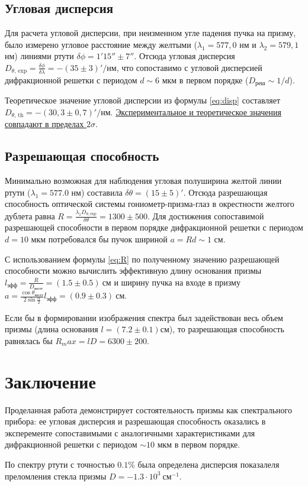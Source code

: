 \documentclass[a4paper,12pt]{article} %
\begin{document}
\subsection{Угловая дисперсия}

Для расчета угловой дисперсии, при неизменном угле падения пучка на призму, было измерено угловое расстояние между желтыми ($\lambda_1 = 577,0$ нм и $\lambda_2 = 579,1$ нм) линиями ртути $\delta \phi = 1'15'' \pm 7''$. Отсюда угловая дисперсия $\boxed{D_{\theta\text{, exp}} = \frac{\delta\phi}{\delta\lambda} = -(35 \pm 3)'/\text{нм}}$, что сопоставимо с угловой дисперсией дифракционной решетки с периодом $d \sim 6$ мкм в первом порядке ($D_\text{реш} \sim 1/d$).

Теоретическое значение угловой дисперсии из формулы \eqref{eq:disp} составляет \\$\boxed{D_{\theta\text{, th}} = -(30,3 \pm 0,7)'/\text{нм}}$. \ul{Экспериментальное и теоретическое значения совпадают в пределах $2\sigma$}.

\subsection{Разрешающая способность}
Минимально возможная для наблюдения угловая полуширина желтой линии ртути ($\lambda_1 = 577.0$ нм) составила $\delta\theta = (15 \pm 5)'$. Отсюда разрешающая способность оптической системы гониометр-призма-глаз в окрестности желтого дублета равна $\boxed{R = \frac{\lambda_1 D_{\theta, \text{exp}}}{ \delta \theta} = 1300 \pm 500}$. Для достижения сопоставимой разрешающей способности в первом порядке дифракционной решетки с периодом $d = 10$ мкм потребовался бы пучок шириной $a = R d \sim 1$ см.

С использованием формулы \eqref{eq:R} по полученному значению разрешающей способности можно вычислить эффективную длину основания призмы $\boxed{l_{\text{эфф}} = \frac{R}{D_\text{желт}} = (1.5 \pm 0.5) ~ \text{см}}$ и ширину пучка на входе в призму $\boxed{a = \frac{\cos\theta_\text{желт}}{2\sin\frac{\alpha}{2}} l_\text{эфф} = (0.9 \pm 0.3)~\text{см}}$. 

Если бы в формировании изображения спектра был задействован весь объем призмы (длина основания $l = (7.2\pm0.1) см$), то разрешающая способность равнялась бы $\boxed{R_max = l D = 6300 \pm 200}$.

\section{Заключение}
Проделанная работа демонстрирует состоятельность призмы как спектрального прибора: ее угловая дисперсия и разрешающая способность оказались в эксперементе сопоставимыми с аналогичными характеристиками для дифракционной решетки с периодом $\sim 10$ мкм в первом порядке. 

По спектру ртути с точностью $0.1\%$ была определена дисперсия показалеля преломления стекла призмы $D = -1.3\cdot 10^3 ~\text{см}^{-1}$. 
\end{document}
